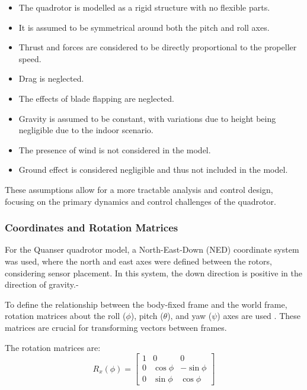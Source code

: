 \documentclass{UoNMCHA}
\numberwithin{equation}{section}
\begin{document}
\begin{itemize}
    \item The quadrotor is modelled as a rigid structure with no flexible parts.
    \item It is assumed to be symmetrical around both the pitch and roll axes.
    \item Thrust and forces are considered to be directly proportional to the propeller speed.
    \item Drag is neglected.
    \item The effects of blade flapping are neglected.
    \item Gravity is assumed to be constant, with variations due to height being negligible due to the indoor scenario.
    \item The presence of wind is not considered in the model.
    \item Ground effect is considered negligible and thus not included in the model.
\end{itemize}

These assumptions allow for a more tractable analysis and control design, focusing on the primary dynamics and control challenges of the quadrotor.

\subsubsection{Coordinates and Rotation Matrices}

For the Quanser quadrotor model, a North-East-Down (NED) coordinate system was used, where the north and east axes were defined between the rotors, considering sensor placement. In this system, the down direction is positive in the direction of gravity.-

To define the relationship between the body-fixed frame and the world frame, rotation matrices about the roll (\(\phi\)), pitch (\(\theta\)), and yaw (\(\psi\)) axes are used \cite{website:RotationMatricies}. These matrices are crucial for transforming vectors between frames.

The rotation matrices are:
\begin{equation}
    R_x(\phi) = \begin{bmatrix}
    1 & 0 & 0 \\
    0 & \cos\phi & -\sin\phi \\
    0 & \sin\phi & \cos\phi
    \end{bmatrix}
    \label{eq:rotation_matrix_x}
    \end{equation}
    
\end{document}

